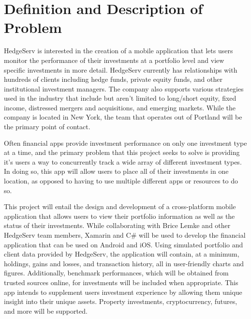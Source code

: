 \documentclass[onecolumn, draftclsnofoot,10pt, compsoc]{IEEEtran}
\begin{document}
\newpage
{}
\tableofcontents
\clearpage

\section{Definition and Description of Problem}

HedgeServ is interested in the creation of a mobile application that lets users monitor the performance of their investments at a portfolio level and view specific investments in more detail. HedgeServ currently has relationships with hundreds of clients including hedge funds, private equity funds, and other institutional investment managers. The company also supports various strategies used in the industry that include but aren’t limited to long/short equity, fixed income, distressed mergers and acquisitions, and emerging markets. While the company is located in New York, the team that operates out of Portland will be the primary point of contact.

Often financial apps provide investment performance on only one investment type at a time, and the primary problem that this project seeks to solve is providing it's users a way to concurrently track a wide array of different investment types. In doing so, this app will allow users to place all of their investments in one location, as opposed to having to use multiple different apps or resources to do so.

This project will entail the design and development of a cross-platform mobile application that allows users to view their portfolio information as well as the status of their investments. While collaborating with Brice Lemke and other HedgeServ team members, Xamarin and C\# will be used to develop the financial application that can be used on Android and iOS. Using simulated portfolio and client data provided by HedgeServ, the application will contain, at a minimum, holdings, gains and losses, and transaction history, all in user-friendly charts and figures. Additionally, benchmark performances, which will be obtained from trusted sources online, for investments will be included when appropriate. This app intends to supplement users investment experience by allowing them unique insight into their unique assets. Property investments, cryptocurrency, futures, and more will be supported.
\end{document}
